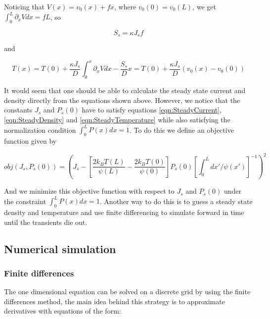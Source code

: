 \documentclass[11pt]{article} %
\begin{document}
Noticing that $V(x) = v_0(x) + f x$, where $v_0(0) = v_0(L)$, we get $\int_0^L \partial_x V dx = f L$, so 

\begin{equation}
S_s = \kappa J_s f
\end{equation}

and

\begin{equation}
T(x) = T(0) + \frac{\kappa J_s}{D} \int_0^x \partial_x V dx - \frac{S_s}{D}x = T(0) + \frac{\kappa J_s}{D} (v_0(x) - v_0(0)) \label{eqn:SteadyTemperature}
\end{equation}

It would seem that one should be able to calculate the steady state current and density directly from the equations shown above. However, we notice that the constants $J_s$ and $P_s(0)$ have to satisfy equations \ref{eqn:SteadyCurrent}, \ref{eqn:SteadyDensity} and \ref{eqn:SteadyTemperature} while also satisfying the normalization condition $\int_0^L P(x) dx = 1$. To do this we define an objective function given by

\begin{equation}
obj(J_s, P_s(0)) = \left (J_s - \left [\frac{2 k_B T(L)}{\psi(L)} - \frac{2 k_B T(0)}{\psi(0)}  \right] P_s(0) \left [\int_0^L dx'/\psi(x') \right]^{-1} \right)^2  \label{eqn:Objective}
\end{equation}

And we minimize this objective function with respect to $J_s$ and $P_s(0)$ under the constraint $\int_0^L P(x) dx = 1$. Another way to do this is to guess a steady state density and temperature and use finite differencing to simulate forward in time until the transients die out.


\subsection{Numerical simulation} \label{numerics}

\subsubsection{Finite differences}
The one dimensional equation can be solved on a discrete grid by using the finite differences method, the main idea behind this strategy is to approximate derivatives with equations of the form:
\end{document}
